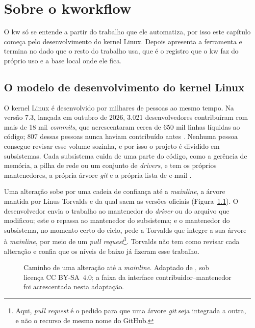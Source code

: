 
\chapter{Sobre o kworkflow}

\label{cap:kworkflow}

O kw só se entende a partir do trabalho que ele automatiza, por isso este
capítulo começa pelo desenvolvimento do kernel Linux. Depois apresenta a
ferramenta e termina no dado que o resto do trabalho usa, que é o registro
que o kw faz do próprio uso e a base local onde ele fica.

\section{O modelo de desenvolvimento do kernel Linux}
\label{sec:modelo-kernel}

O kernel Linux é desenvolvido por milhares de pessoas ao mesmo tempo. Na
versão 7.3, lançada em outubro de 2026, 3.021 desenvolvedores contribuíram
com mais de 18 mil \textit{commits}, que acrescentaram cerca de 650 mil linhas
líquidas ao código; 807 dessas pessoas nunca haviam contribuído antes
\citep{corbet2026stats73}. Nenhuma pessoa consegue revisar esse volume
sozinha, e por isso o projeto é dividido em subsistemas. Cada subsistema
cuida de uma parte do código, como a gerência de memória, a pilha de rede ou
um conjunto de \textit{drivers}, e tem os próprios mantenedores, a própria
árvore \textit{git} e a própria lista de e-mail \citep{kerneldocprocess}. 

Uma alteração sobe por uma cadeia de confiança até a \textit{mainline}, a
árvore mantida por Linus Torvalds e da qual saem as versões oficiais
(Figura~\ref{fig:caminho-patch}). O desenvolvedor envia o trabalho ao
mantenedor do \textit{driver} ou do arquivo que modificou; este o repassa ao
mantenedor do subsistema; e o mantenedor do subsistema, no momento certo do
ciclo, pede a Torvalds que integre a sua árvore à \textit{mainline}, por meio
de um \textit{pull request}\footnote{Aqui, \textit{pull request} é o pedido
para que uma árvore \textit{git} seja integrada a outra, e não o recurso de
mesmo nome do GitHub.}. Torvalds não tem como revisar cada alteração e confia
que os níveis de baixo já fizeram esse trabalho.

\begin{figure}[htbp]
  \centering
  \resizebox{\textwidth}{!}{}
  \caption{Caminho de uma alteração até a \textit{mainline}. Adaptado de
    \citet{kroah2018kerneldev}, sob licença CC BY-SA~4.0; a faixa da
    interface contribuidor--mantenedor foi acrescentada nesta adaptação.}
  \label{fig:caminho-patch}
\end{figure}

